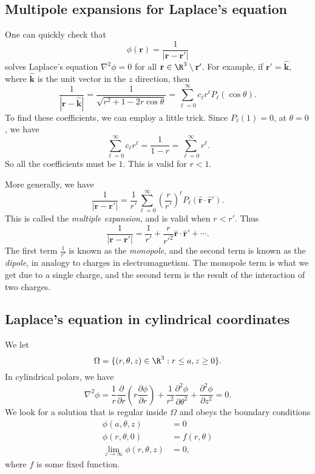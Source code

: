 \documentclass[a4paper]{article}
\begin{document}
\subsection{Multipole expansions for Laplace's equation}
One can quickly check that
\[
  \phi(\mathbf{r}) = \frac{1}{|\mathbf{r} - \mathbf{r}'|}
\]
solves Laplace's equation $\nabla^2 \phi = 0$ for all $\mathbf{r}\in \R^3 \setminus \mathbf{r}'$. For example, if $\mathbf{r}' = \hat{\mathbf{k}}$, where $\hat{\mathbf{k}}$ is the unit vector in the $z$ direction, then
\[
  \frac{1}{|\mathbf{r} - \hat{\mathbf{k}}|} = \frac{1}{\sqrt{r^2 + 1 - 2r \cos \theta}} = \sum_{\ell = 0}^\infty c_\ell r^\ell P_\ell(\cos \theta).
\]
To find these coefficients, we can employ a little trick. Since $P_\ell(1) = 0$, at $\theta = 0$, we have
\[
  \sum_{\ell = 0}^\infty c_\ell r^\ell = \frac{1}{1 - r} = \sum_{\ell = 0}^\infty r^\ell.
\]
So all the coefficients must be $1$. This is valid for $r < 1$.

More generally, we have
\[
  \frac{1}{|\mathbf{r} - \mathbf{r}'|} = \frac{1}{r'} \sum_{\ell = 0}^\infty \left(\frac{r}{r'}\right)^\ell P_\ell(\hat{\mathbf{r}}\cdot \hat{\mathbf{r}}').
\]
This is called the \emph{multiple expansion}, and is valid when $r < r'$. Thus
\[
  \frac{1}{|\mathbf{r} - \mathbf{r}'|} = \frac{1}{r'} + \frac{r}{r'^2}\hat{\mathbf{r}}\cdot \hat{\mathbf{r}}' + \cdots.
\]
The first term $\frac{1}{r'}$ is known as the \emph{monopole}, and the second term is known as the \emph{dipole}, in analogy to charges in electromagnetism. The monopole term is what we get due to a single charge, and the second term is the result of the interaction of two charges.

\subsection{Laplace's equation in cylindrical coordinates}
We let
\[
  \Omega = \{(r, \theta, z) \in \R^3: r \leq a, z \geq 0\}.
\]
In cylindrical polars, we have
\[
  \nabla^2 \phi = \frac{1}{r}\frac{\partial}{\partial r}\left(r \frac{\partial \phi}{\partial r}\right) + \frac{1}{r^2}\frac{\partial^2 \phi}{\partial \theta^2} + \frac{\partial^2 \phi}{\partial z^2} = 0.
\]
We look for a solution that is regular inside $\Omega$ and obeys the boundary conditions
\begin{align*}
  \phi(a, \theta, z) &= 0\\
  \phi(r, \theta, 0) &= f(r, \theta)\\
  \lim_{z\to \infty} \phi(r, \theta, z) &= 0,
\end{align*}
where $f$ is some fixed function.
\end{document}
